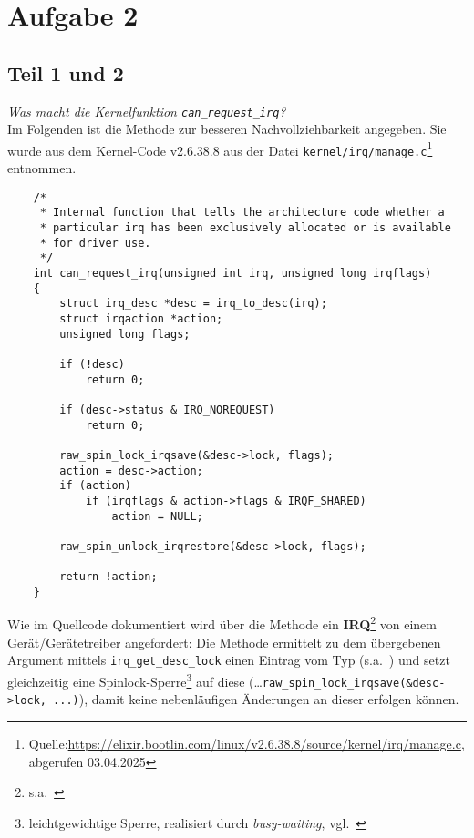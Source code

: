 \chapter{Aufgabe 2}

\section{Teil 1 und 2}

\textit{Was macht die Kernelfunktion \texttt{can\_request\_irq}?}\\

\noindent
Im Folgenden ist die Methode zur besseren Nachvollziehbarkeit angegeben.
Sie wurde aus dem Kernel-Code v2.6.38.8 aus der Datei \texttt{kernel/irq/manage.c}\footnote{
Quelle:\url{https://elixir.bootlin.com/linux/v2.6.38.8/source/kernel/irq/manage.c}, abgerufen 03.04.2025
} entnommen.\\

\begin{verbatim}
    /*
     * Internal function that tells the architecture code whether a
     * particular irq has been exclusively allocated or is available
     * for driver use.
     */
    int can_request_irq(unsigned int irq, unsigned long irqflags)
    {
        struct irq_desc *desc = irq_to_desc(irq);
        struct irqaction *action;
        unsigned long flags;

        if (!desc)
            return 0;

        if (desc->status & IRQ_NOREQUEST)
            return 0;

        raw_spin_lock_irqsave(&desc->lock, flags);
        action = desc->action;
        if (action)
            if (irqflags & action->flags & IRQF_SHARED)
                action = NULL;

        raw_spin_unlock_irqrestore(&desc->lock, flags);

        return !action;
    }
\end{verbatim}

\noindent
Wie im Quellcode dokumentiert wird über die Methode ein \textbf{IRQ}\footnote{s.a.~\cite[52]{Man20d}} von einem Gerät/Gerätetreiber angefordert: Die Methode ermittelt zu dem übergebenen Argument  mittels \texttt{irq\_get\_desc\_lock} einen Eintrag vom Typ  (s.a.~\cite[64 f.]{Man20d}) und setzt gleichzeitig eine Spinlock-Sperre\footnote{
    leichtgewichtige Sperre, realisiert durch \textit{busy-waiting}, vgl.~\cite[150]{Man20g}
} auf diese  (\ldots \texttt{raw\_spin\_lock\_irqsave(&desc->lock, ...)}), damit keine nebenläufigen Änderungen an dieser erfolgen können.\\

